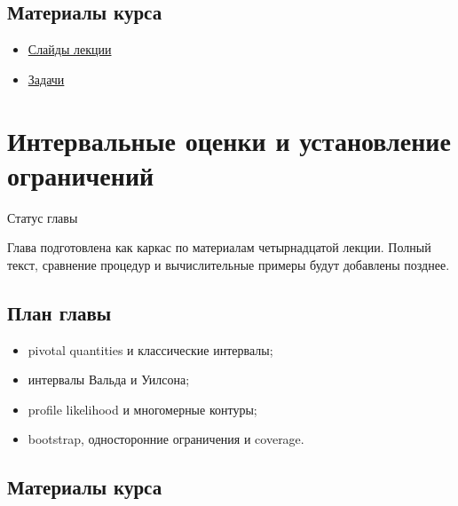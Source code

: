\documentclass[
  russian,
  letterpaper,
]{scrbook}
\providecommand{\tightlist}{%
  \setlength{\itemsep}{0pt}\setlength{\parskip}{0pt}}
\begin{document}
\section{Материалы
курса}\label{ux43cux430ux442ux435ux440ux438ux430ux43bux44b-ux43aux443ux440ux441ux430-10}

\begin{itemize}
\tightlist
\item
  \href{https://neutrinohit.github.io/statistical-analysis-course/ru/slides/12_feldman_cousins_and_cls.html}{Слайды
  лекции}
\item
  \href{https://neutrinohit.github.io/statistical-analysis-course/ru/slides/exercises/12_feldman_cousins_and_cls_exercises.html}{Задачи}
\end{itemize}

\chapter{Интервальные оценки и установление
ограничений}\label{ux438ux43dux442ux435ux440ux432ux430ux43bux44cux43dux44bux435-ux43eux446ux435ux43dux43aux438-ux438-ux443ux441ux442ux430ux43dux43eux432ux43bux435ux43dux438ux435-ux43eux433ux440ux430ux43dux438ux447ux435ux43dux438ux439}

{Статус главы}

Глава подготовлена как каркас по материалам четырнадцатой лекции. Полный
текст, сравнение процедур и вычислительные примеры будут добавлены
позднее.

\section{План
главы}\label{ux43fux43bux430ux43d-ux433ux43bux430ux432ux44b-12}

\begin{itemize}
\tightlist
\item
  pivotal quantities и классические интервалы;
\item
  интервалы Вальда и Уилсона;
\item
  profile likelihood и многомерные контуры;
\item
  bootstrap, односторонние ограничения и coverage.
\end{itemize}

\section{Материалы
курса}\label{ux43cux430ux442ux435ux440ux438ux430ux43bux44b-ux43aux443ux440ux441ux430-11}
\end{document}
